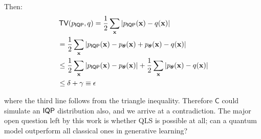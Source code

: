 Then:
\begin{align}
&\operatorname{\textsf{TV}}(p_{\operatorname{\textsf{IQP}}}, q) = \frac{1}{2}\sum_{\mathbf{x}}|p_{\operatorname{\textsf{IQP}}}(\mathbf{x})-q(\mathbf{x})| \nonumber\\
&= \frac{1}{2}\sum_{\mathbf{x}}|p_{\operatorname{\textsf{IQP}}}(\mathbf{x}) - p_{\boldsymbol\theta}(\mathbf{x}) + p_{\boldsymbol\theta}(\mathbf{x})-q(\mathbf{x})|\nonumber\\
&\leq \frac{1}{2}\sum_{\mathbf{x}}|p_{\operatorname{\textsf{IQP}}}(\mathbf{x}) -p_{\boldsymbol\theta}(\mathbf{x})| +\frac{1}{2}\sum_{\mathbf{x}}|p_{\boldsymbol\theta}(\mathbf{x})-q(\mathbf{x})|\nonumber\\
&\leq \delta+\gamma \equiv \epsilon
\end{align}

\noindent where the third line follows from the triangle inequality. Therefore $\mathsf{C}$ could simulate an $\operatorname{\textsf{IQP}}$ distribution also, and we arrive at a contradiction. The major open question left by this work is whether QLS is possible at all; can a quantum model outperform all classical ones in generative learning?


